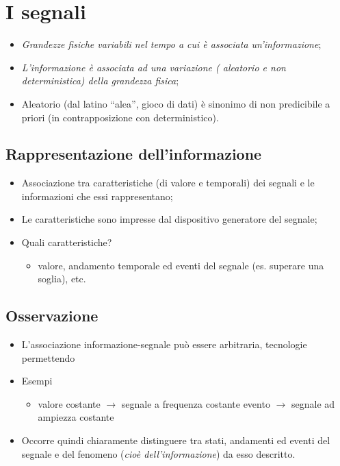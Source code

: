 \documentclass{book}
\begin{document}
\section{I segnali}
\begin{itemize}
	\item \textit{Grandezze fisiche variabili nel tempo a cui è associata
		un'informazione};
	\item \textit{L'informazione è associata ad una variazione ({\color{red}
		aleatorio} e non deterministica) della grandezza fisica};
	\item Aleatorio (dal latino ``alea'', gioco di dati) è sinonimo di non
		predicibile a priori (in contrapposizione con deterministico).
\end{itemize}
\subsection{Rappresentazione dell'informazione}
\begin{itemize}
	\item Associazione tra caratteristiche (di valore e temporali) dei segnali
		e le informazioni che essi rappresentano;
	\item Le caratteristiche sono impresse dal dispositivo generatore del
		segnale;
	\item Quali caratteristiche?
		\begin{itemize}
			\item valore, andamento temporale ed eventi del segnale (es.
				superare una soglia), etc.
		\end{itemize}
\end{itemize}
\subsection{Osservazione}
\begin{itemize}
	\item L'associazione informazione-segnale può essere arbitraria,
		tecnologie permettendo
	\item Esempi
		\begin{itemize}
			\item valore costante $\to$ segnale a frequenza costante evento
				$\to$ segnale ad ampiezza costante
		\end{itemize}
	\item Occorre quindi chiaramente distinguere tra stati, andamenti ed eventi
		del segnale e del fenomeno (\textit{cioè dell'informazione}) da esso
		descritto.
\end{itemize}
\end{document}
